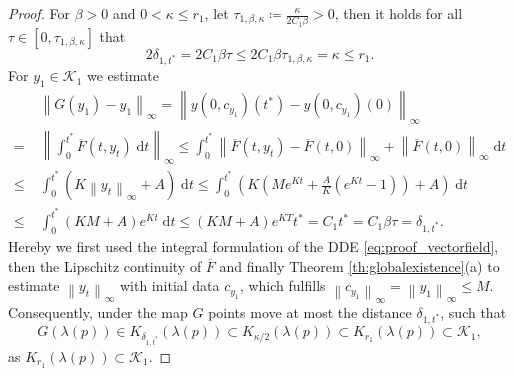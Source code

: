\documentclass[10pt]{article}
\numberwithin{equation}{section}
\newcommand*{\dd}{\mathrm{d}}
\newcommand\norm[1]{\left\lVert#1\right\rVert}
\begin{document}
	\begin{proof}
		For $\beta>0$ and  $0<\kappa\leq r_1$, let $\tau_{1,\beta,\kappa}\coloneqq \frac{\kappa}{2C_1 \beta}>0$, then it holds for all $\tau \in [0,\tau_{1,\beta,\kappa}]$ that
		\begin{equation*}
			2\delta_{1,t^\ast} = 2C_1 \beta \tau \leq 2 C_1 \beta\tau_{1,\beta,\kappa} = \kappa \leq   r_1.
		\end{equation*}
		For  $y_1 \in \mathcal{K}_1$ we estimate
		\begin{align*}
			&\norm{G(y_1)-y_1}_\infty = \norm{y(0,c_{y_1})(t^\ast)-y(0,c_{y_1})(0)}_\infty  \\ =\;&\norm{\int_0^{t^\ast}\overline F(t,y_t)\; \dd t }_\infty \leq \int_0^{t^\ast} \norm{\overline F(t,y_t)-\overline F(t,0) }_\infty +  \norm{\overline F(t,0)}_\infty \; \dd t \\
			\leq\;  & \int_0^{t^\ast} (K \norm{y_t}_\infty + A) \; \dd t \leq \int_0^{t^\ast} \left(K \left(Me^{Kt}+\frac{A}{K}\left(e^{Kt}-1\right)\right) + A \right) \; \dd t \\
			\leq \; & \int_0^{t^\ast} (KM+A)e^{Kt} \; \dd t  \leq (KM+A)e^{KT} t^\ast = C_1 t^\ast = C_1 \beta \tau =   \delta_{1,t^\ast}.
		\end{align*}
		Hereby we first used the integral formulation of the DDE \eqref{eq:proof_vectorfield}, then the Lipschitz continuity of $\overline{F}$ and finally Theorem \ref{th:globalexistence}(a) to estimate $\norm{y_t}_\infty$ with initial data $c_{y_1}$, which fulfills $\norm{c_{y_1}}_\infty = \norm{y_1}_\infty \leq M$. Consequently, under the map $G$ points move at most the distance $\delta_{1,t^\ast}$, such that
		\begin{equation*}
			G(\lambda(p))\in K_{\delta_{1,t^\ast}}(\lambda(p)) \subset K_{\kappa/2}(\lambda(p)) \subset K_{r_1}(\lambda(p)) \subset \mathcal{K}_1,
		\end{equation*}
		as $K_{r_1}(\lambda(p))\subset \mathcal{K}_1$. 
	\end{proof}
	
\end{document}
